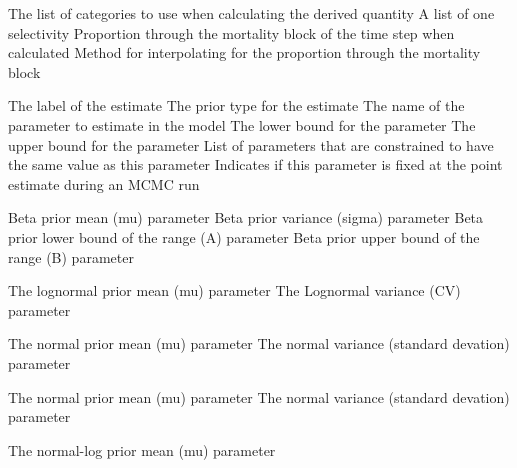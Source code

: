  {The list of categories to use when calculating the derived quantity}
 {A list of one selectivity}
 {Proportion through the mortality block of the time step when calculated}
 {Method for interpolating for the proportion through the mortality block}
\par\textbf{}\par
\par\textbf{}\par
{}\par\par
{} {The label of the estimate}
 {The prior type for the estimate}
 {The name of the parameter to estimate in the model}
 {The lower bound for the parameter}
 {The upper bound for the parameter}
 {List of parameters that are constrained to have the same value as this parameter}
 {Indicates if this parameter is fixed at the point estimate during an MCMC run}
\par\textbf{}\par
{} {Beta prior  mean (mu) parameter}
 {Beta prior variance (sigma) parameter}
 {Beta prior lower bound of the range (A) parameter}
 {Beta prior upper bound of the range (B) parameter}
\par\textbf{}\par
{} {The lognormal prior mean (mu) parameter}
 {The Lognormal variance (CV) parameter}
\par\textbf{}\par
{} {The normal prior mean (mu) parameter}
 {The normal variance (standard devation) parameter}
\par\textbf{}\par
{} {The normal prior mean (mu) parameter}
 {The normal variance (standard devation) parameter}
\par\textbf{}\par
{} {The normal-log prior mean (mu) parameter}
